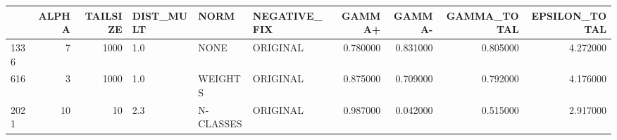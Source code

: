 \begin{tabular}{lrrlllrrrr}
\toprule
 & ALPHA & TAILSIZE & DIST_MULT & NORM & NEGATIVE_FIX & GAMMA+ & GAMMA- & GAMMA_TOTAL & EPSILON_TOTAL \\
\midrule
1336 & 7 & 1000 & 1.0 & NONE & ORIGINAL & 0.780000 & 0.831000 & 0.805000 & 4.272000 \\
616 & 3 & 1000 & 1.0 & WEIGHTS & ORIGINAL & 0.875000 & 0.709000 & 0.792000 & 4.176000 \\
2021 & 10 & 10 & 2.3 & N-CLASSES & ORIGINAL & 0.987000 & 0.042000 & 0.515000 & 2.917000 \\
\bottomrule
\end{tabular}

